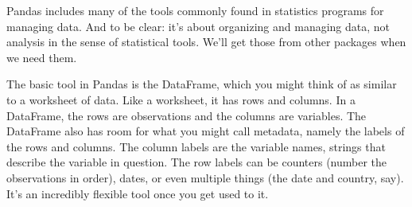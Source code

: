 \documentclass[11pt]{article}
\begin{document}
Pandas includes many of the tools commonly found in statistics programs
for managing data.
And to be clear:   it's about organizing and managing data, not
analysis in the sense of statistical tools.
We'll get those from other packages when we need them.

The basic tool in Pandas is the DataFrame,
which you might think of as similar to a worksheet of data.
Like a worksheet, it has rows and columns.
In a DataFrame, the rows are observations and the columns are variables.
The DataFrame also has room for what you might call metadata,
namely the labels of the rows and columns.
The column labels are the variable names, strings that describe
the variable in question.
The row labels can be counters (number the observations in order),
dates, or even multiple things (the date and country, say).
It's an incredibly flexible tool once you get used to it.
\end{document}
